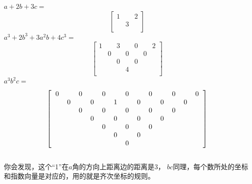 \documentclass[UTF8]{ctexart}
\begin{document}
$ a+2b+3c= $
\renewcommand*{\arraystretch}{1.732}\[\left[\begin{matrix}
	1& &2 \\
	& 3& \\
\end{matrix}\right]\]
$ a^{3}+2b^{3}+3a^{2}b+4c^{3}= $
\renewcommand*{\arraystretch}{1.732}\[\left[\begin{matrix}
	1& & 3& & 0& &2 \\
	& 0& &0 & &0 & \\
	& & 0& &0 & & \\
	& & & 4& & & \\
\end{matrix}\right]\]
$ a^{3}b^{2}c= $
\renewcommand*{\arraystretch}{1.732}\[
\left[\begin{matrix}
	\begin{tabular}{ccccccccccccc}
		0& &0& &0& &0& &0& &0& &0\\
		&0& &0& &1& &0& &0& &0&\\
		& &0& &0& &0& &0& &0& &\\
		& & &0& &0& &0& &0& & &\\
		& & & &0& &0& &0& & & &\\
		& & & & &0& &0& & & & &\\
		& & & & & &0& & & & & &\\
	\end{tabular}
\end{matrix}\right]
\]\\
你会发现，这个“1”在$ a $角的方向上距离边的距离是$ 3 $，
$ bc $同理，每个数所处的坐标和指数向量是对应的，用的就是齐次坐标的规则。
\end{document}
